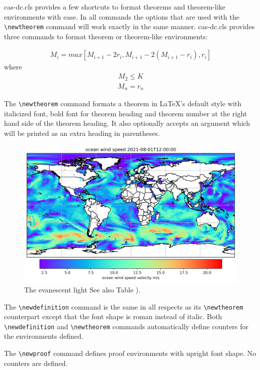 \documentclass[a4paper,fleqn]{cas-dc}
\begin{document}
{cas-dc.cls} provides a few shortcuts to format theorems and
theorem-like environments with ease. In all commands the options that
are used with the \verb+\newtheorem+ command will work exactly in the same
manner. {cas-dc.cls} provides three commands to format theorem or
theorem-like environments: 

\begin{align}
\label{eq1}
M_i = max[M_{i+1}-2r_i,M_{i+1}-2(M_{i+1}-r_i),r_i]
\end{align}
where
\begin{align}
\label{eq2}
M_2 \le K
\end{align}
\begin{align}
\label{eq3}
M_n = r_n
\end{align}

The \verb+\newtheorem+ command formats a
theorem in \LaTeX's default style with italicized font, bold font
for theorem heading and theorem number at the right hand side of the
theorem heading.  It also optionally accepts an argument which
will be printed as an extra heading in parentheses. 


\begin{figure}[h!t]
  \centering
    \includegraphics[width=\linewidth]{fig2.png}
  \caption{The evanescent light See also Table ).}
  \label{fig2}
\end{figure}

The \verb+\newdefinition+ command is the same in
all respects as its \verb+\newtheorem+ counterpart except that
the font shape is roman instead of italic.  Both
\verb+\newdefinition+ and \verb+\newtheorem+ commands
automatically define counters for the environments defined.

The \verb+\newproof+ command defines proof environments with
upright font shape.  No counters are defined. 
\end{document}
